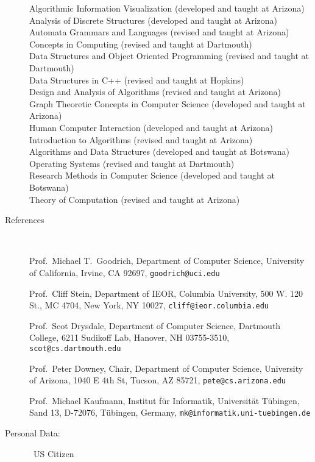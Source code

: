 \documentclass[10pt]{article}
\begin{document}
\begin{description}
Algorithmic Information Visualization (developed and taught at Arizona)\\
Analysis of Discrete Structures (developed and taught at Arizona)\\
Automata Grammars and Languages (revised and taught at Arizona)\\
Concepts in Computing (revised and taught at Dartmouth)\\
Data Structures and Object Oriented Programming (revised and taught at Dartmouth)\\
Data Structures in C++ (revised and taught at Hopkins)\\
Design and Analysis of Algorithms (revised and taught at Arizona)\\
Graph Theoretic Concepts in Computer Science (developed and taught at Arizona)\\
Human Computer Interaction (developed and taught at Arizona)\\
Introduction to Algorithms (revised and taught at Arizona)\\
Algorithms and Data Structures (developed and taught at Botswana)\\
Operating Systems (revised and taught at Dartmouth)\\
Research Methods in Computer Science (developed and taught at Botswana)\\
Theory of Computation (revised and taught at Arizona)



\newpage
\item [References]\

Prof.~Michael T.~Goodrich, Department of Computer Science, University of California, Irvine, CA 92697, {\tt goodrich@uci.edu} 

Prof.~Cliff Stein, Department of IEOR, Columbia University, 500 W. 120 St., MC 4704, New York, NY 10027, {\tt cliff@ieor.columbia.edu}

Prof.~Scot Drysdale, Department of Computer Science,
Dartmouth College,
6211 Sudikoff Lab,
Hanover, NH 03755-3510, {\tt scot@cs.dartmouth.edu}

Prof.~Peter Downey, Chair, Department of Computer Science, University of Arizona, 1040 E 4th St, Tucson, AZ 85721, {\tt pete@cs.arizona.edu}

Prof.~Michael Kaufmann, Institut f{\"u}r Informatik, Universit{\"a}t T{\"u}bingen, Sand 13, D-72076, T{\"u}bingen, Germany, {\tt mk@informatik.uni-tuebingen.de}


\item [Personal Data:]\ US Citizen


\end{description}



\end{document}
